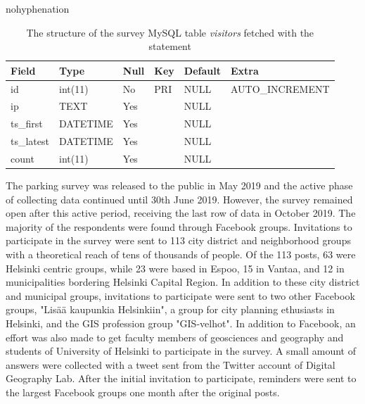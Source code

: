 \begin{hyphenrules}{nohyphenation}
    \begin{table}[H]
        \centering
        \setlength\tabcolsep{1.2ex}
        \caption[Structure of MySQL table visitors]{The structure of the survey MySQL table \textit{visitors} fetched with the statement } 
        \label{tab:mysql_visitors_str}
        \begin{tabular}{ @{} >{\raggedright\arraybackslash}p{2cm} >{\raggedright\arraybackslash}p{2cm} >{\raggedright\arraybackslash}p{1cm} >{\raggedright\arraybackslash}p{1cm} >{\raggedright\arraybackslash}p{1.5cm} >{\raggedleft\arraybackslash}p{4cm} @{} }
            \toprule
            Field & Type & Null & Key & Default & Extra \\
            \midrule
            id & int(11) & No & PRI & NULL & AUTO\_INCREMENT \\
            ip & TEXT & Yes & & NULL & \\
            ts\_first & DATETIME & Yes & & NULL & \\
            ts\_latest & DATETIME & Yes & & NULL & \\
            count & int(11) & Yes & & NULL & \\        
            \bottomrule
        \end{tabular}
    \end{table} 
\end{hyphenrules}

The parking survey was released to the public in May 2019 and the active phase of collecting data continued until 30th June 2019. However, the survey remained open after this active period, receiving the last row of data in October 2019. The majority of the respondents were found through Facebook groups. Invitations to participate in the survey were sent to 113 city district and neighborhood groups with a theoretical reach of tens of thousands of people. Of the 113 posts, 63 were Helsinki centric groups, while 23 were based in Espoo, 15 in Vantaa, and 12 in municipalities bordering Helsinki Capital Region. In addition to these city district and municipal groups, invitations to participate were sent to two other Facebook groups, "Lisää kaupunkia Helsinkiin", a group for city planning ethusiasts in Helsinki, and the GIS profession group "GIS-velhot". In addition to Facebook, an effort was also made to get faculty members of geosciences and geography and students of University of Helsinki to participate in the survey. A small amount of answers were collected with a tweet sent from the Twitter account of Digital Geography Lab. After the initial invitation to participate, reminders were sent to the largest Facebook groups one month after the original posts.

